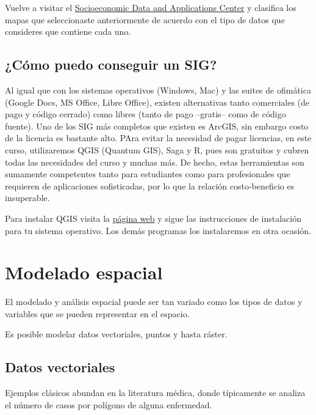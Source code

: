 \documentclass[
]{book}
\begin{document}
Vuelve a visitar el \href{https://sedac.ciesin.columbia.edu/}{Socioeconomic Data and Applications Center} y clasifica los mapas que seleccionaste anteriormente de acuerdo con el tipo de datos que consideres que contiene cada uno.

\hypertarget{cuxf3mo-puedo-conseguir-un-sig}{%
\subsection{¿Cómo puedo conseguir un SIG?}\label{cuxf3mo-puedo-conseguir-un-sig}}

Al igual que con los sistemas operativos (Windows, Mac) y las suites de ofimática (Google Docs, MS Office, Libre Office), existen alternativas tanto comerciales (de pago y código cerrado) como libres (tanto de pago --gratis-- como de código fuente). Uno de los SIG más completos que existen es ArcGIS, sin embargo costo de la licencia es bastante alto. PAra evitar la necesidad de pagar licencias, en este curso, utilizaremos QGIS (Quantum GIS), Saga y R, pues son gratuitos y cubren todas las necesidades del curso y muchas más. De hecho, estas herramientas son sumamente competentes tanto para estudiantes como para profesionales que requieren de aplicaciones sofisticadas, por lo que la relación costo-beneficio es insuperable.

Para instalar QGIS visita la \href{https://qgis.org/es/site/}{página web} y sigue las instrucciones de instalación para tu sistema operativo. Los demás programas los instalaremos en otra ocasión.

\hypertarget{modelado-espacial}{%
\section{Modelado espacial}\label{modelado-espacial}}

El modelado y análisis espacial puede ser tan variado como los tipos de datos y variables que se pueden representar en el espacio.

Es posible modelar datos vectoriales, puntos y hasta ráster.

\hypertarget{datos-vectoriales}{%
\subsection{Datos vectoriales}\label{datos-vectoriales}}

Ejemplos clásicos abundan en la literatura médica, donde típicamente se analiza el número de casos por polígono de alguna enfermedad.
\end{document}
